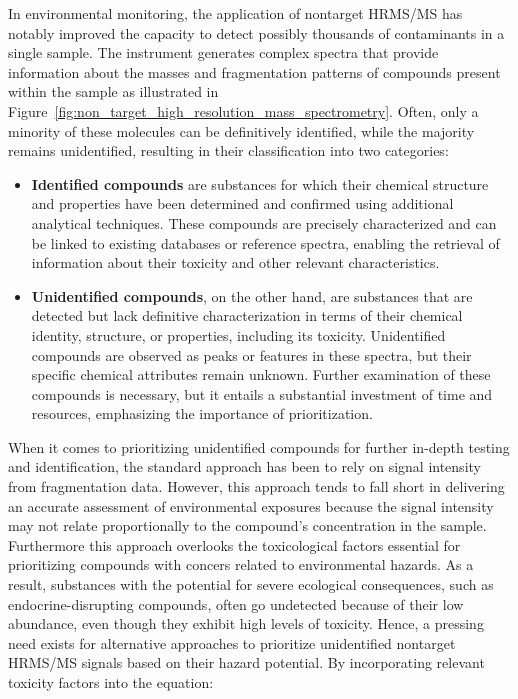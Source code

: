 In environmental monitoring, the application of nontarget HRMS/MS has notably improved the capacity to detect possibly thousands of contaminants in a single sample. The instrument generates complex spectra that provide information about the masses and fragmentation patterns of compounds present within the sample as illustrated in Figure~\ref{fig:non_target_high_resolution_mass_spectrometry}. Often, only a minority of these molecules can be definitively identified, while the majority remains unidentified, resulting in their classification into two categories:
\begin{itemize}
    \item \textbf{Identified compounds} are substances for which their chemical structure and properties have been determined and confirmed using additional analytical techniques. These compounds are precisely characterized and can be linked to existing databases or reference spectra, enabling the retrieval of information about their toxicity and other relevant characteristics.
    \item \textbf{Unidentified compounds}, on the other hand, are substances that are detected but lack definitive characterization in terms of their chemical identity, structure, or properties, including its toxicity. Unidentified compounds are observed as peaks or features in these spectra, but their specific chemical attributes remain unknown. 
    Further examination of these compounds is necessary, but it entails a substantial investment of time and resources, emphasizing the importance of prioritization.
    
\end{itemize}

When it comes to prioritizing unidentified compounds for further in-depth testing and identification, the standard approach has been to rely on signal intensity from fragmentation data. However, this approach tends to fall short in delivering an accurate assessment of environmental exposures because the signal intensity may not relate proportionally to the compound's concentration in the sample. Furthermore this approach overlooks the toxicological factors essential for prioritizing compounds with concers related to environmental hazards. As a result, substances with the potential for severe ecological consequences, such as endocrine-disrupting compounds, often go undetected because of their low abundance, even though they exhibit high levels of toxicity. Hence, a pressing need exists for alternative approaches to prioritize unidentified nontarget HRMS/MS signals based on their hazard potential. By incorporating relevant toxicity factors into the equation:

